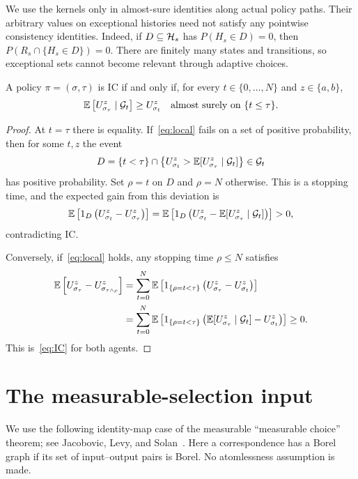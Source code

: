 \documentclass[11pt]{extarticle}
\begin{document}
We use the kernels only in almost-sure identities along actual policy
paths. Their arbitrary values on exceptional histories need not satisfy
any pointwise consistency identities. Indeed, if $D\subseteq\mathcal{H}_s$
has $P(H_s\in D)=0$, then
$P(R_s\cap\{H_s\in D\})=0$. There are finitely many states and transitions,
so exceptional sets cannot become relevant through adaptive choices.

\begin{lemma}\label{lem:local}
A policy $\pi=(\sigma,\tau)$ is IC if and only if, for every
$t\in\{0,\ldots,N\}$ and $z\in\{a,b\}$,
\begin{equation}
    \mathbb{E}\left[U^z_{\sigma_\tau}\mid\mathcal{G}_t\right]
    \geq U^z_{\sigma_t}
    \quad\text{almost surely on }\{t\leq\tau\}.
    \label{eq:local}
\end{equation}
\end{lemma}
\begin{proof}
At $t=\tau$ there is equality. If~\eqref{eq:local} fails on a set of
positive probability, then for some $t,z$ the event
\[
    D=\{t<\tau\}\cap
       \left\{U^z_{\sigma_t}>
               \mathbb{E}[U^z_{\sigma_\tau}\mid\mathcal{G}_t]\right\}
       \in\mathcal{G}_t
\]
has positive probability. Set $\rho=t$ on $D$ and $\rho=N$ otherwise.
This is a stopping time, and the expected gain from this deviation is
\[
    \mathbb{E}\left[1_D\left(U^z_{\sigma_t}-U^z_{\sigma_\tau}\right)\right]
    =\mathbb{E}\left[1_D\left(U^z_{\sigma_t}
             -\mathbb{E}[U^z_{\sigma_\tau}\mid\mathcal{G}_t]\right)\right]>0,
\]
contradicting IC.

Conversely, if~\eqref{eq:local} holds, any stopping time $\rho\leq N$
satisfies
\begin{align*}
    \mathbb{E}\left[U^z_{\sigma_\tau}
                 -U^z_{\sigma_{\tau\wedge\rho}}\right]
    &=\sum_{t=0}^{N}
      \mathbb{E}\left[1_{\{\rho=t<\tau\}}
                  \left(U^z_{\sigma_\tau}-U^z_{\sigma_t}\right)\right]\\
    &=\sum_{t=0}^{N}
      \mathbb{E}\left[1_{\{\rho=t<\tau\}}
                  \left(\mathbb{E}[U^z_{\sigma_\tau}\mid\mathcal{G}_t]
                                  -U^z_{\sigma_t}\right)\right]\geq0.
\end{align*}
This is~\eqref{eq:IC} for both agents.
\end{proof}

\section{The measurable-selection input}\label{sec:selection}

We use the following identity-map case of the measurable
``measurable choice'' theorem; see
Jacobovic, Levy, and Solan~\cite[Theorem 4, pp.~226--227]{JLS}.
Here a correspondence has a Borel graph if its set of input--output
pairs is Borel. No atomlessness assumption is made.
\end{document}
